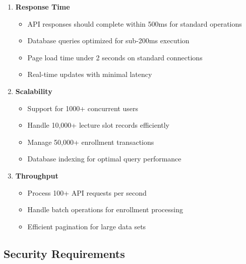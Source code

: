 \documentclass[12pt,a4paper]{report}
\begin{document}
\begin{enumerate}[leftmargin=*]
    \item \textbf{Response Time}
    \begin{itemize}
        \item API responses should complete within 500ms for standard operations
        \item Database queries optimized for sub-200ms execution
        \item Page load time under 2 seconds on standard connections
        \item Real-time updates with minimal latency
    \end{itemize}
    
    \item \textbf{Scalability}
    \begin{itemize}
        \item Support for 1000+ concurrent users
        \item Handle 10,000+ lecture slot records efficiently
        \item Manage 50,000+ enrollment transactions
        \item Database indexing for optimal query performance
    \end{itemize}
    
    \item \textbf{Throughput}
    \begin{itemize}
        \item Process 100+ API requests per second
        \item Handle batch operations for enrollment processing
        \item Efficient pagination for large data sets
    \end{itemize}
\end{enumerate}

\subsection{Security Requirements}
\end{document}

